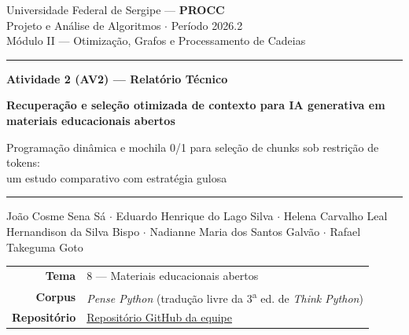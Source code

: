 \documentclass[11pt,a4paper]{article}
\theoremstyle{plain}
\theoremstyle{definition}
\theoremstyle{plain}
\begin{document}
\begin{titlepage}
\thispagestyle{empty}
\centering
\vspace*{0.6cm}
{\normalsize\color{cinza}
Universidade Federal de Sergipe --- \textbf{\color{azul}PROCC}\\[2pt]
Projeto e Análise de Algoritmos $\cdot$ Período 2026.2\\[2pt]
Módulo II --- Otimização, Grafos e Processamento de Cadeias \par}

\vfill
{\color{laranja}\rule{0.7\textwidth}{2pt}}\par
\vspace{10pt}
{\large\color{laranja}\textbf{Atividade 2 (AV2) --- Relatório Técnico}}\par
\vspace{14pt}
{\Huge\bfseries\color{azul}
Recuperação e seleção otimizada de contexto
para IA generativa em materiais educacionais abertos\par}

\vspace{10pt}
{\large\color{cinza}
Programação dinâmica e mochila 0/1 para seleção
de chunks sob restrição de tokens:\\
um estudo comparativo com estratégia gulosa\par}
\vspace{8pt}
{\color{azul}\rule{0.7\textwidth}{2pt}}\par

\vspace{20pt}
{\large
João Cosme Sena Sá $\cdot$ Eduardo Henrique do Lago Silva $\cdot$ Helena Carvalho Leal\\[4pt]
Hernandison da Silva Bispo $\cdot$ Nadianne Maria dos Santos Galvão $\cdot$ Rafael Takeguma Goto\par}

\vspace{18pt}
\begin{tabular}{@{}r@{\quad}l@{}}
\textbf{Tema}            & 8 --- Materiais educacionais abertos\\
\textbf{Corpus}          & \emph{Pense Python} (tradução livre da 3\textsuperscript{a} ed. de \emph{Think Python})\\
\textbf{Repositório}     & \small\href{https://github.com/joaocss/PAA_UFS_2026_2_SenaSa_Joao_Bispo_Hernandison_Galvao_Nadianne_Goto_Rafael_Leal_Helena_Silva_Eduardo}{Repositório GitHub da equipe}\\


\end{tabular}
\end{titlepage}
\end{document}
